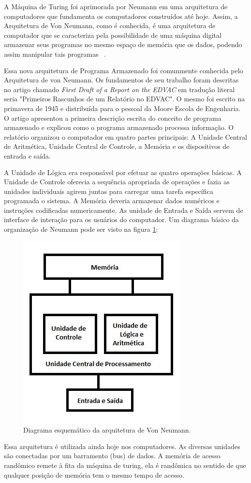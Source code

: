 \documentclass[12pt]{article}
\begin{document}
A Máquina de Turing foi aprimorada por Neumann em uma arquitetura de computadores que fundamenta os computadores construídos até hoje. Assim, a Arquitetura de Von Neumann, como é conhecida, é uma arquitetura de computador que se caracteriza pela possibilidade de uma máquina digital armazenar seus programas no mesmo espaço de memória que os dados, podendo assim manipular tais programas ~\cite{vonneumann}.

Essa nova arquitetura de Programa Armazenado foi comunmente conhecida pelo Arquitetura de von Neumann. Os fundamentos de seu trabalho foram descritas no artigo chamado \emph{First Draft of a Report on the EDVAC} \cite{von1945} em tradução literal seria "Primeiros Rascunhos de um Relatório no EDVAC". O mesmo foi escrito na primavera de 1945 e distribuída para o pessoal da Moore Escola de Engenharia. O artigo apresentou a primeira descrição escrita do conceito de programa armazenado e explicou como o programa armazenado processa informação.
O relatório organizou o computador em quatro partes principais: A Unidade Central de Aritmética, Unidade Central de Controle, a Memória e os dispositivos de entrada e saída.

A Unidade de Lógica era responsável por efetuar as quatro operações básicas. A Unidade de Controle oferecia a sequência apropriada de operações e fazia as unidades individuais agirem juntas para carregar uma tarefa específica programada o sistema. A Memória deveria armazenar dados numéricos e instruções codificadas numericamente. As unidade de Entrada e Saída servem de interface de interação para os usuários do computador.
Um diagrama básico da organização de Neumann pode ser visto na figura \ref{fig:exampleFig2}:


\begin{figure}[!ht]
\centering
\includegraphics[width=.3\textwidth]{fig2.jpg}
\caption{Diagrama esquemático da arquitetura de Von Neumann.}
\label{fig:exampleFig2}
\end{figure}

Essa arquitetura é utilizada ainda hoje nos computadores. As diversas unidades são conectadas por um barramento (bus) de dados. A memória de acesso randômico remete à fita da máquina de turing, ela é randômica no sentido de que qualquer posição de memória tem o mesmo tempo de acesso.
\end{document}

